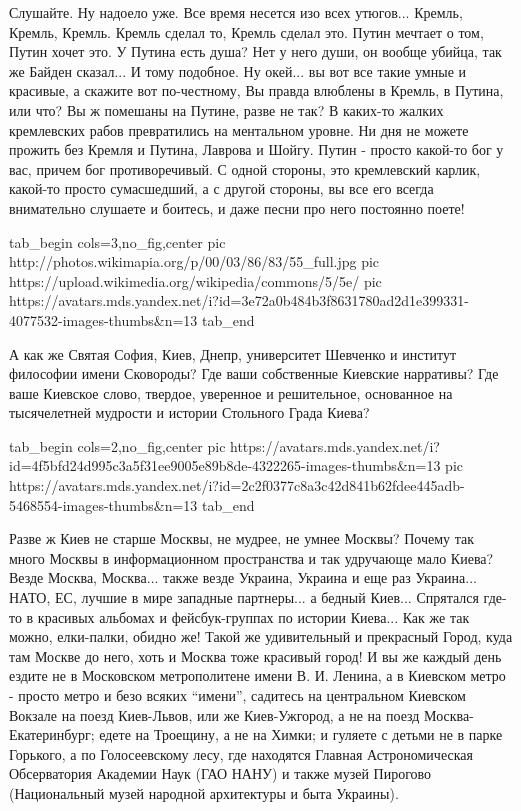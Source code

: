 Слушайте. Ну надоело уже. Все время несется изо всех утюгов... Кремль, Кремль,
Кремль. Кремль сделал то, Кремль сделал это. Путин мечтает о том, Путин хочет
это. У Путина есть душа? Нет у него души, он вообще убийца, так же Байден
сказал...  И тому подобное. Ну окей...  вы вот все такие умные и красивые, а
скажите вот по-честному, Вы правда влюблены в Кремль, в Путина, или что? Вы ж
помешаны на Путине, разве не так? В каких-то жалких кремлевских рабов
превратились на ментальном уровне. Ни дня не можете прожить без Кремля и
Путина, Лаврова и Шойгу. Путин - просто какой-то бог у вас, причем бог
противоречивый. С одной стороны, это кремлевский карлик, какой-то просто
сумасшедший, а с другой стороны, вы все его всегда внимательно слушаете и
боитесь, и даже песни про него постоянно поете!

\ifcmt
  tab_begin cols=3,no_fig,center
     pic http://photos.wikimapia.org/p/00/03/86/83/55_full.jpg
		 pic https://upload.wikimedia.org/wikipedia/commons/5/5e/%
		 pic https://avatars.mds.yandex.net/i?id=3e72a0b484b3f8631780ad2d1e399331-4077532-images-thumbs&n=13 
  tab_end
\fi

А как же Святая София, Киев, Днепр, университет Шевченко и институт
философии имени Сковороды? Где ваши собственные Киевские нарративы? Где ваше
Киевское слово, твердое, уверенное и решительное, основанное на тысячелетней
мудрости и истории Стольного Града Киева? 

\ifcmt
  tab_begin cols=2,no_fig,center
     pic https://avatars.mds.yandex.net/i?id=4f5bfd24d995c3a5f31ee9005e89b8de-4322265-images-thumbs&n=13
		 pic https://avatars.mds.yandex.net/i?id=2c2f0377c8a3c42d841b62fdee445adb-5468554-images-thumbs&n=13
  tab_end
\fi

Разве ж Киев не старше Москвы, не мудрее, не умнее Москвы?  Почему так много
Москвы в информационном пространства и так удручающе мало Киева? Везде Москва,
Москва... также везде Украина, Украина и еще раз Украина... НАТО, ЕС, лучшие в
мире западные партнеры...  а бедный Киев... Спрятался где-то в красивых
альбомах и фейсбук-группах по истории Киева... Как же так можно, елки-палки,
обидно же! Такой же удивительный и прекрасный Город, куда там Москве до него,
хоть и Москва тоже красивый город! И вы же каждый день ездите не в Московском
метрополитене имени В. И. Ленина, а в Киевском метро - просто метро и безо
всяких \enquote{имени}, садитесь на центральном Киевском Вокзале на поезд
Киев-Львов, или же  Киев-Ужгород, а не на поезд Москва-Екатеринбург; едете на
Троещину, а не на Химки; и гуляете с детьми не в парке Горького, а по
Голосеевскому лесу, где находятся Главная Астрономическая Обсерватория Академии
Наук (ГАО НАНУ) и также музей Пирогово (Национальный музей народной архитектуры
и быта Украины).

